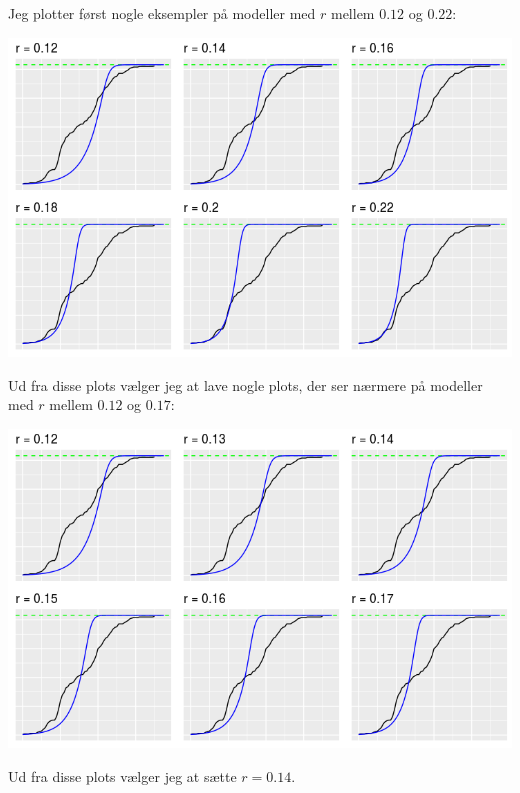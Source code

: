 \documentclass[12pt]{article}
\begin{document}
\begin{enumerate}
Jeg plotter først nogle eksempler på modeller med $r$ mellem $0.12$ og $0.22$:
\begin{center}
\includegraphics[scale=0.5]{q2p6.png}
\end{center}
Ud fra disse plots vælger jeg at lave nogle plots, der ser nærmere på modeller med $r$ mellem $0.12$ og $0.17$:
\begin{center}
\includegraphics[scale=0.5]{q2p7.png}
\end{center}
Ud fra disse plots vælger jeg at sætte $r=0.14$.


\end{enumerate}
\end{document}
